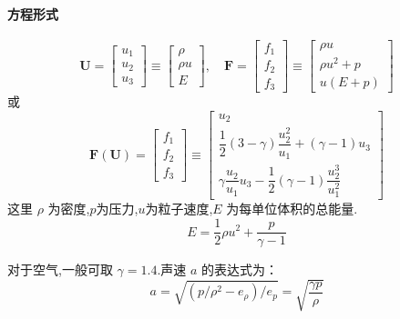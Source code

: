 \documentclass{book}
\begin{document}
\paragraph{方程形式}
\begin{equation}
  \mathbf{U}=\left[\begin{array}{l}
      u_{1} \\
      u_{2} \\
      u_{3}
    \end{array}\right] \equiv\left[\begin{array}{c}
      \rho   \\
      \rho u \\
      E
    \end{array}\right], \quad \mathbf{F}=\left[\begin{array}{c}
      f_{1} \\
      f_{2} \\
      f_{3}
    \end{array}\right] \equiv\left[\begin{array}{c}
      \rho u       \\
      \rho u^{2}+p \\
      u(E+p)
    \end{array}\right]
\end{equation}
或
\begin{equation}
  \mathbf{F}(\mathbf{U})=\left[\begin{array}{l}
      f_{1} \\
      f_{2} \\
      f_{3}
    \end{array}\right] \equiv\left[\begin{array}{c}
      u_{2}                                                            \\
      \dfrac{1}{2}(3-\gamma) \dfrac{u_{2}^{2}}{u_{1}}+(\gamma-1) u_{3} \\
      \gamma \dfrac{u_{2}}{u_{1}} u_{3}-\dfrac{1}{2}(\gamma-1) \dfrac{u_{2}^{3}}{u_{1}^{2}}
    \end{array}\right]
\end{equation}
这里 $\rho$ 为密度,$p$为压力,$u$为粒子速度,$E$ 为每单位体积的总能量.
\begin{equation}
  E=\dfrac{1}{2}\rho u^{2}+\frac{p}{\gamma-1}
\end{equation}

对于空气,一般可取 $\gamma=1.4$.声速 $a$ 的表达式为：
\begin{equation}
  a=\sqrt{\left(p / \rho^{2}-e_{\rho}\right) / e_{p}}=\sqrt{\dfrac{\gamma p}{\rho}}
\end{equation}
\end{document}
